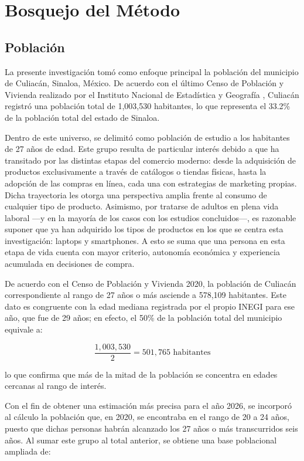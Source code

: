 \section{Bosquejo del Método}

\subsection{Población}

La presente investigación tomó como enfoque principal la población del
municipio de Culiacán, Sinaloa, México. De acuerdo con el último Censo de
Población y Vivienda realizado por el Instituto Nacional de Estadística y
Geografía \parencite[p.~23]{inegi2021}, Culiacán registró una población total de
1,003,530 habitantes, lo que representa el 33.2\% de la población total del
estado de Sinaloa.

Dentro de este universo, se delimitó como población de estudio a los habitantes
de 27 años de edad. Este grupo resulta de particular interés debido a que ha
transitado por las distintas etapas del comercio moderno: desde la adquisición
de productos exclusivamente a través de catálogos o tiendas físicas, hasta la
adopción de las compras en línea, cada una con estrategias de marketing propias.
Dicha trayectoria les otorga una perspectiva amplia frente al consumo de
cualquier tipo de producto. Asimismo, por tratarse de adultos en plena vida
laboral —y en la mayoría de los casos con los estudios concluidos—, es razonable
suponer que ya han adquirido los tipos de productos en los que se centra esta
investigación: laptops y smartphones. A esto se suma que una persona en esta
etapa de vida cuenta con mayor criterio, autonomía económica y experiencia
acumulada en decisiones de compra.

De acuerdo con el Censo de Población y Vivienda 2020, la población de Culiacán
correspondiente al rango de 27 años o más asciende a 578,109 habitantes. Este
dato es congruente con la edad mediana registrada por el propio INEGI para ese
año, que fue de 29 años; en efecto, el 50\% de la población total del municipio
equivale a:

\[
\frac{1{,}003{,}530}{2} = 501{,}765 \text{ habitantes}
\]

lo que confirma que más de la mitad de la población se concentra en edades
cercanas al rango de interés.

Con el fin de obtener una estimación más precisa para el año 2026, se incorporó
al cálculo la población que, en 2020, se encontraba en el rango de 20 a 24 años,
puesto que dichas personas habrán alcanzado los 27 años o más transcurridos seis
años. Al sumar este grupo al total anterior, se obtiene una base poblacional
ampliada de:

